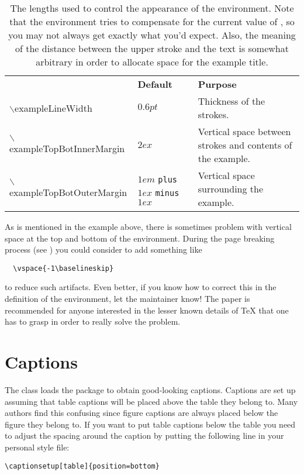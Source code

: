 \begin{table}[tb]
  \centering
  \caption{\label{tab:example-lengths}%
  The lengths used to control the appearance of the  environment.  Note that the environment tries to compensate for the current value of , so you may not always get exactly what you'd expect.  Also, the meaning of the distance between the upper stroke and the text is somewhat arbitrary in order to allocate space for the example title.}

  \begin{tabular}{>{\small\ttfamily}l p{} p{}}
    \toprule
    {\normalsize\normalfont\textbf{Length}} & \textbf{Default} & \textbf{Purpose} \\
    \otoprule
    $\backslash$exampleLineWidth & $\unit{0.6}{pt}$ & Thickness of the strokes. \\
    \midrule
    $\backslash$exampleTopBotInnerMargin & $\unit{2}{ex}$ & Vertical space between strokes and contents of the example. \\
    \midrule
    $\backslash$exampleTopBotOuterMargin & $\unit{1}{em}$ \texttt{plus} $\unit{1}{ex}$ \texttt{minus} $\unit{1}{ex}$ & Vertical space surrounding the example. \\
    \bottomrule
  \end{tabular}
\end{table}

As is mentioned in the example above, there is sometimes problem with vertical space at the top and bottom of the  environment.  During the page breaking process (see ) you could consider to add something like
{\verbatimsize
\begin{verbatim}
  \vspace{-1\baselineskip}
\end{verbatim}}
to reduce such artifacts.  Even better, if you know how to correct this in the definition of the environment, let the \rtthesis maintainer know!  The paper \citet{RyckoJackowski93TeXIndentPar} is recommended for anyone interested in the lesser known details of \TeX{} that one has to grasp in order to really solve the problem.

\section{Captions}\label{sec:rtthesis:captions}
%
The \rtthesis class loads the  package to obtain good-looking captions.  Captions are set up assuming that table captions will be placed above the table they belong to.  Many authors find this confusing since figure captions are always placed below the figure they belong to.  If you want to put table captions below the table you need to adjust the spacing around the caption by putting the following line in your personal style file:
{\verbatimsize
\begin{verbatim}
\captionsetup[table]{position=bottom}
\end{verbatim}}

